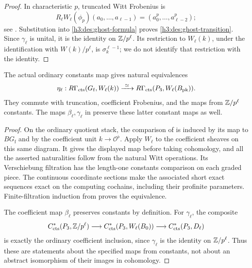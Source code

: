\begin{proof}
In characteristic \(p\), truncated Witt Frobenius is
\[
 R_\ell W_\ell(\phi_p)(a_0,\ldots,a_{\ell-1})
          =(a_0^p,\ldots,a_{\ell-2}^p);
\]
see \cite[Lemma~8]{Hesselholt}.
Substitution into \eqref{h3:des:ghost-formula} proves
\eqref{h3:des:ghost-transition}.  Since \(\gamma_\ell\)
is unital, it is the identity on \(\mathbb Z/p^\ell\).
Its restriction to \(W_\ell(k)\), under the identification
with \(W(k)/p^\ell\), is \(\sigma_k^{\ell-1}\);
we do not identify that restriction with the identity.
\end{proof}

\begin{lemma}\label{h3:des:witt-constants}
The actual ordinary constants map gives natural equivalences
\[
 \eta_\ell:
 R\Gamma_{\mathrm{cts}}(G_{\mathrm f},W_\ell(k))
    \xrightarrow{\ \simeq\ }
 R\Gamma_{\mathrm{cts}}(P_3,W_\ell(B_{\mathrm{pk}})).
\]
They commute with truncation, coefficient Frobenius, and
the maps from \(\mathbb Z/p^\ell\) constants.  The maps
\(\beta_\ell,\gamma_\ell\) in 
preserve these latter constant maps as well.
\end{lemma}

\begin{proof}
On the ordinary quotient stack, the comparison of
 is induced by its map to
\(BG_{\mathrm f}\) and by the coefficient unit
\(k\to\mathcal O^\flat\).  Apply \(W_\ell\) to the
coefficient sheaves on this same diagram.  It gives
the displayed map before taking cohomology, and all
the asserted naturalities follow from the natural
Witt operations.  Its Verschiebung filtration has
the length-one constants comparison on each graded
piece.  The continuous coordinate sections make
the associated short exact sequences exact on the
computing cochains, including their profinite
parameters.  Finite-filtration induction from
 proves the equivalence.

The coefficient map \(\beta_\ell\) preserves constants
by definition.  For \(\gamma_\ell\), the composite
\[
 C^*_{\mathrm{cts}}(P_3,\mathbb Z/p^\ell)
   \longrightarrow C^*_{\mathrm{cts}}(P_3,W_\ell(B_0))
   \longrightarrow C^*_{\mathrm{cts}}(P_3,D_\ell)
\]
is exactly the ordinary coefficient inclusion, since
\(\gamma_\ell\) is the identity on \(\mathbb Z/p^\ell\).
Thus these are statements about the specified maps
from constants, not about an abstract isomorphism
of their images in cohomology.
\end{proof}

